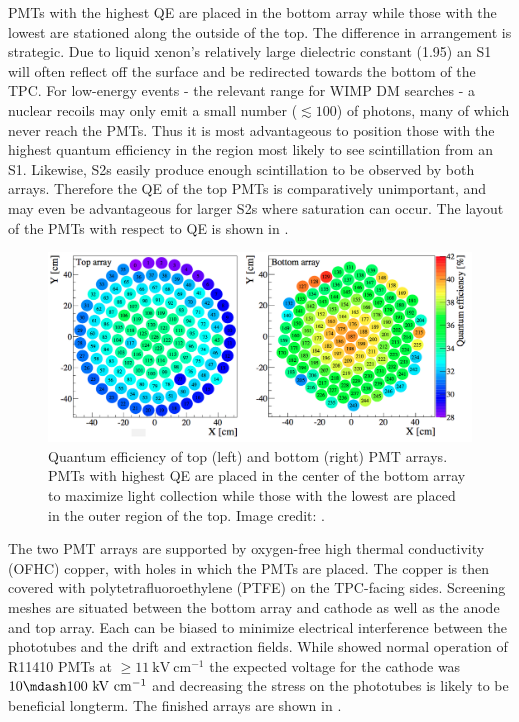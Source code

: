 PMTs with the highest QE are placed in the bottom array while those with the lowest are stationed along the outside of the
top.  The difference in arrangement is strategic.  Due to liquid xenon's relatively large dielectric constant (1.95) an S1 will
often reflect off the surface and be redirected towards the bottom of the TPC.  For low-energy events - the relevant range for WIMP DM
searches - a nuclear recoils may only emit a small number ($\lesssim 100$) of photons, many of which never reach the PMTs.  Thus it is
most advantageous to position those with the highest quantum efficiency in the region most likely to see scintillation from an
S1.  Likewise, S2s easily produce enough scintillation to be observed by both arrays.  Therefore the QE of the top PMTs is comparatively
unimportant, and may even be advantageous for larger S2s where saturation can occur.  The layout of the PMTs with respect to QE is shown
in .

\begin{figure}
\centering
\includegraphics[width=\textwidth]{PMTQuantumEfficiency}
\caption{Quantum efficiency of top (left) and bottom (right) PMT arrays.  PMTs with highest QE are placed in the center of the bottom
array to maximize light collection while those with the lowest are placed in the outer region of the top.  Image credit:
.}
\label{fig:xenon1t_pmt_qe}
\end{figure}

The two PMT arrays are supported by oxygen-free high thermal conductivity (OFHC) copper, with holes in which the PMTs are placed.  The
copper is then covered with polytetrafluoroethylene (PTFE) on the TPC-facing sides.  Screening meshes are situated between the bottom
array and cathode as well as the anode and top array.  Each can be biased to minimize electrical interference between the
phototubes and the drift and extraction fields.  While  showed normal operation of R11410 PMTs at
$\geq 11\ \mathrm{kV\ cm^{-1}}$ the expected voltage for the cathode was $10 \mdash 100\ \mathrm{kV\ cm^{-1}}$ and decreasing the stress
on the phototubes is likely to be beneficial longterm.  The finished arrays are shown in .


